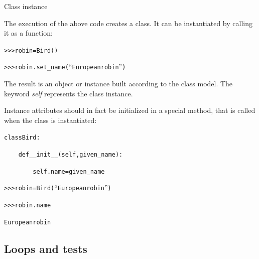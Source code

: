 \documentclass[xcolor=pdftex,dvipsnames,table,mathserif]{beamer}
\begin{document}
\begin{frame}{Class instance}

  The execution of the above code creates a class. It can be instantiated by calling it as a function:

  \begin{block}{}
    \begin{alltt}
    >>> robin = Bird()

    >>> robin.set\_name(``European robin'')
    \end{alltt}
  \end{block}

  The result is an object or instance built according to the class model. The keyword \emph{self} represents the class instance.

  Instance attributes should in fact be initialized in a special method, that is called when the class is instantiated:

  \begin{block}{}
    \begin{alltt}
      class Bird:

      ~~~~ def \_\_init\_\_(self, given\_name):

      ~~~~ ~~~~ self.name = given\_name

      \end{alltt}
  \end{block}

  \begin{block}{}
    \begin{alltt}
    >>> robin = Bird(``European robin'')

    >>> robin.name

    European robin
    \end{alltt}
  \end{block}



\end{frame}


\subsection{Loops and tests}
\end{document}
